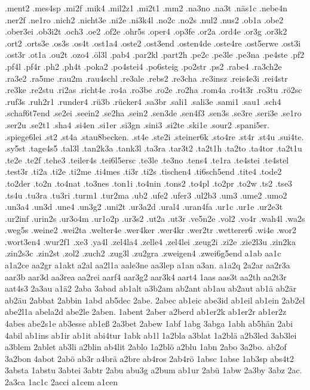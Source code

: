{.ment2
.mes4sp
.mi2f
.mik4
.mil2z1
.mi2t1
.mm2
.na3no
.na3t
.näs1c
.nebe4n
.ner2f
.ne1ro
.nich2
.nicht3e
.ni2e
.ni3k4l
.no2c
.no2s
.nul2
.nus2
.ob1a
.obe2
.ober3ei
.ob3i2t
.och3
.oe2
.of2e
.ohr5s
.oper4
.op3fe
.or2a
.ord4e
.or3g
.or3k2
.ort2
.orts3e
.os3s
.os4t
.ost1a4
.oste2
.ost3end
.osten4de
.oste4re
.ost5erwe
.ost3i
.ost3r
.ot1a
.ou2t
.ozo4
.öl3l
.pab4
.par2kl
.part2h
.pe2c
.pe3le
.pe3na
.pe4ste
.pf2
.pf4l
.pf4r
.ph2
.ph4t
.poka2
.po4stei4
.po6steig
.po2str
.ps2
.rabe4
.ra3ch2e
.ra3e2
.ra5me
.rau2m
.rau4schl
.re3ale
.rebs2
.re3cha
.re3insz
.reis4e3i
.rei4str
.re3ke
.re2stu
.ri2as
.richt4e
.ro4a
.ro3be
.ro2e
.ro2ha
.rom4a
.ro4t3r
.ro3tu
.rö2sc
.ruf3s
.ruh2r1
.runder4
.rü3b
.rücker4
.sa3br
.sali1
.sali3e
.sami1
.sau1
.sch4
.schaf6t7end
.se2ei
.seein2
.se2ha
.sein2
.sen3de
.sen4f3
.sen3s
.se3re
.seri3e
.se1ro
.ser2u
.se2t1
.sha4
.si4en
.si1er
.si3gn
.sini3
.si2te
.ski1e
.sour2
.spani5er.
.spiege6lei
.st2
.st4a
.stau8becken.
.st4e
.ste2i
.steiner6k
.sto4re
.st4r
.st4u
.sui4te.
.sy5st
.tage4s5
.tal3l
.tan2k3a
.tank3l
.ta3ra
.tar3t2
.ta2t1h
.ta2to
.ta4tor
.ta2t1u
.te2e
.te2f
.tehe3
.teiler4s
.tei6l5ersc
.te3le
.te3no
.tens4
.te1ra
.te4stei
.te4stel
.test3r
.ti2a
.ti2e
.ti2me
.ti4mes
.ti3r
.ti2s
.tischen4
.ti6sch5end
.tite4
.tode2
.to2der
.to2n
.to4nat
.to3nes
.ton1i
.to4nin
.tons2
.to4pl
.to2pr
.to2w
.ts2
.tse3
.ts4u
.tu3ra
.tu3ri
.turm1
.tur2ma
.ub2
.ufe2
.ufer3
.ul2b3
.um3
.ume2
.umo2
.un3a4
.un3d
.une4
.un3g2
.uni2t
.ur3a2d
.ural4
.uran4fa
.ur1c
.ur1e
.ur2e3t
.ur2inf
.urin2s
.ur3o4m
.ur1o2p
.ur3s2
.ut2a
.ut3r
.ve5n2e
.vol2
.vo4r
.wah4l
.wa2s
.weg5s
.weine2
.wei2ta
.welter4e
.wer4ker
.wer4kr
.wer2tr
.wetterer6
.wi4e
.wor2
.wort3en4
.wur2f1
.xe3
.ya4l
.zel4la4
.zelle4
.zel4lei
.zeug2i
.zi2e
.zie2l3u
.zin2ka
.zin2s3c
.zin2st
.zol2
.zuch2
.zug3l
.zu2gra
.zweigen4
.zwei6g5end
a1ab
aa1c
a1a2ce
aa2gr
a1akt
a2al
aa2l1a
aale3ne
aa3lep
a1an
a3an.
a1a2q
2a2ar
aa2r3a
aar3b
aar3d
aa3rea
aa2rei
aarf4
aar3g2
aar3k4
aart4
1aas
aas3t
aa2th
aa2t3r
aat4s3
2a3au
a1ä2
2aba
3abad
ab1alt
a3b2am
ab2ant
ab1au
ab2aut
ab1ä
ab2är
ab2äu
2abbat
2abbin
1abd
ab5dec
2abe.
2abec
ab1eic
abe3id
ab1eil
ab1ein
2ab2el
abe2l1a
abela2d
abe2le
2aben.
1abent
2aber
a2berd
ab1er2k
ab1er2r
ab1er2z
4abes
abe2s1e
ab3esse
ab1eß
2a3bet
2abew
1abf
1abg
3abga
1abh
ab5hän
2abi
4abil
ab1ins
ab1ir
ab1it
abi4tur
1abk
ab1l
1a2bla
a3blat
1a2blä
a2b3led
3ab3lei
a3blem
2ablet
ab3li
a2blin
ab4lit
2ablo
1a2blö
a2blu
1abn
2abo
3a2bo.
ab2of
3a2bon
4abot
2abö
ab3r
a4brä
a2bre
ab4ros
2ab4rö
1absc
1abse
1ab3sp
abs4t2
3absta
1abstu
3abtei
3abtr
2abu
abu3g
a2bum
ab1ur
2abü
1abw
2a3by
3abz
2ac.
2a3ca
1ac1c
2acci
a1cem
a1cen
}

